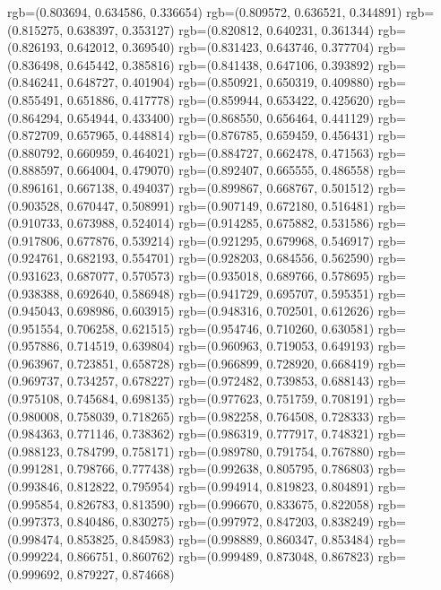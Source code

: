 {{{					rgb=(0.803694, 0.634586, 0.336654)
					rgb=(0.809572, 0.636521, 0.344891)
					rgb=(0.815275, 0.638397, 0.353127)
					rgb=(0.820812, 0.640231, 0.361344)
					rgb=(0.826193, 0.642012, 0.369540)
					rgb=(0.831423, 0.643746, 0.377704)
					rgb=(0.836498, 0.645442, 0.385816)
					rgb=(0.841438, 0.647106, 0.393892)
					rgb=(0.846241, 0.648727, 0.401904)
					rgb=(0.850921, 0.650319, 0.409880)
					rgb=(0.855491, 0.651886, 0.417778)
					rgb=(0.859944, 0.653422, 0.425620)
					rgb=(0.864294, 0.654944, 0.433400)
					rgb=(0.868550, 0.656464, 0.441129)
					rgb=(0.872709, 0.657965, 0.448814)
					rgb=(0.876785, 0.659459, 0.456431)
					rgb=(0.880792, 0.660959, 0.464021)
					rgb=(0.884727, 0.662478, 0.471563)
					rgb=(0.888597, 0.664004, 0.479070)
					rgb=(0.892407, 0.665555, 0.486558)
					rgb=(0.896161, 0.667138, 0.494037)
					rgb=(0.899867, 0.668767, 0.501512)
					rgb=(0.903528, 0.670447, 0.508991)
					rgb=(0.907149, 0.672180, 0.516481)
					rgb=(0.910733, 0.673988, 0.524014)
					rgb=(0.914285, 0.675882, 0.531586)
					rgb=(0.917806, 0.677876, 0.539214)
					rgb=(0.921295, 0.679968, 0.546917)
					rgb=(0.924761, 0.682193, 0.554701)
					rgb=(0.928203, 0.684556, 0.562590)
					rgb=(0.931623, 0.687077, 0.570573)
					rgb=(0.935018, 0.689766, 0.578695)
					rgb=(0.938388, 0.692640, 0.586948)
					rgb=(0.941729, 0.695707, 0.595351)
					rgb=(0.945043, 0.698986, 0.603915)
					rgb=(0.948316, 0.702501, 0.612626)
					rgb=(0.951554, 0.706258, 0.621515)
					rgb=(0.954746, 0.710260, 0.630581)
					rgb=(0.957886, 0.714519, 0.639804)
					rgb=(0.960963, 0.719053, 0.649193)
					rgb=(0.963967, 0.723851, 0.658728)
					rgb=(0.966899, 0.728920, 0.668419)
					rgb=(0.969737, 0.734257, 0.678227)
					rgb=(0.972482, 0.739853, 0.688143)
					rgb=(0.975108, 0.745684, 0.698135)
					rgb=(0.977623, 0.751759, 0.708191)
					rgb=(0.980008, 0.758039, 0.718265)
					rgb=(0.982258, 0.764508, 0.728333)
					rgb=(0.984363, 0.771146, 0.738362)
					rgb=(0.986319, 0.777917, 0.748321)
					rgb=(0.988123, 0.784799, 0.758171)
					rgb=(0.989780, 0.791754, 0.767880)
					rgb=(0.991281, 0.798766, 0.777438)
					rgb=(0.992638, 0.805795, 0.786803)
					rgb=(0.993846, 0.812822, 0.795954)
					rgb=(0.994914, 0.819823, 0.804891)
					rgb=(0.995854, 0.826783, 0.813590)
					rgb=(0.996670, 0.833675, 0.822058)
					rgb=(0.997373, 0.840486, 0.830275)
					rgb=(0.997972, 0.847203, 0.838249)
					rgb=(0.998474, 0.853825, 0.845983)
					rgb=(0.998889, 0.860347, 0.853484)
					rgb=(0.999224, 0.866751, 0.860762)
					rgb=(0.999489, 0.873048, 0.867823)
					rgb=(0.999692, 0.879227, 0.874668)
}}}
